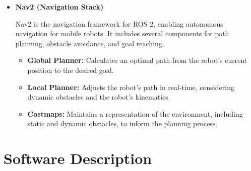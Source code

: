 {\begin{enumerate}[label=\textbf{\arabic*}.]
\begin{itemize}
			\item \textbf{Nav2 (Navigation Stack)} \par Nav2 is the navigation framework for ROS 2, enabling autonomous navigation for
			mobile robots. It includes several components for path planning, obstacle avoidance, and goal reaching.
			\begin{itemize}
				\item \textbf{Global Planner:} Calculates an optimal path from the robot's current position to the desired goal.
				\item \textbf{Local Planner:} Adjusts the robot's path in real-time, considering dynamic obstacles and the robot's kinematics.
				\item \textbf{Costmaps:} Maintains a representation of the environment, including static and dynamic obstacles, to inform the planning process.
			\end{itemize}
		\end{itemize}
	\end{enumerate}
}

\section{\fontsize{14}{16} Software Description}
